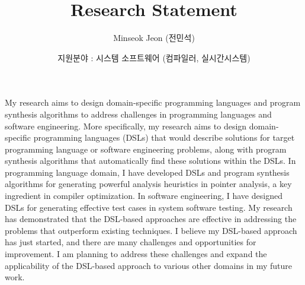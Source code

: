 \documentclass[11pt]{article}
\begin{document}
\title{Research Statement}
\author{Minseok Jeon (전민석)}

\date{지원분야 : 시스템 소프트웨어 (컴파일러, 실시간시스템)}


\newcommand{\DisjunctiveModel}{\textsc{Disjunctive Model}}
\newcommand{\FeatureLanguage}{\textsc{Feature Language}}
\newcommand{\GDL}{\textsc{Graph Description Language}}


\newcommand{\AbstractRelativeWritePattern}{{``Abstract Relative Write Pattern''}}

\maketitle 

My research aims to design domain-specific programming languages and program synthesis algorithms to address challenges in programming languages and software engineering. 
%
More specifically, my research aims to design domain-specific programming languages (DSLs) that would describe solutions for target programming language or software engineering problems, along with program synthesis algorithms that automatically find these solutions within the DSLs.
%
In programming language domain, I have developed DSLs and program synthesis algorithms for generating powerful analysis heuristics in pointer analysis, a key ingredient in compiler optimization.
%
In software engineering, I have designed DSLs for generating effective test cases in system software testing.
%
My research has demonstrated that the DSL-based approaches are effective in addressing the problems that outperform existing techniques.
%
I believe my DSL-based approach has just started, and there are many challenges and opportunities for improvement. 
%
I am planning to address these challenges and expand the applicability of the DSL-based approach to various other domains in my future work.
%
%
\end{document}
